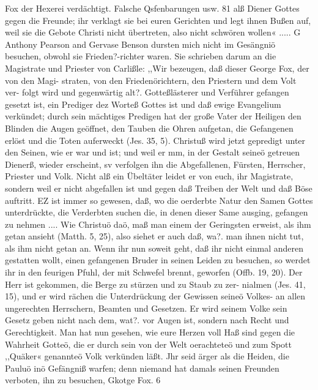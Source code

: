 Fox der Hexerei verdächtigt. Falsche Qsfenbarungen usw. 81
alß Diener Gottes gegen die Freunde; ihr verklagt sie bei euren
Gerichten und legt ihnen Bußen auf, weil sie die Gebote Christi
nicht übertreten, also nicht schwören wollen« ..... G
Anthony Pearson and Gervase Benson dursten mich nicht im
Gesängniö besuchen, obwohl sie Frieden?-richter waren. Sie
schrieben darum an die Magistrate und Priester von Carlißle:
,,Wir bezeugen, daß dieser George Fox, der von den Magi-
straten, von den Friedenörichtern, den Priestern und dem Volt ver-
folgt wird und gegenwärtig alt?. Gotteßlästerer und Verführer
gefangen gesetzt ist, ein Prediger dez Worteß Gottes ist und daß
ewige Evangelium verkündet; durch sein mächtiges Predigen hat
der große Vater der Heiligen den Blinden die Augen geöffnet,
den Tauben die Ohren aufgetan, die Gefangenen erlöst und die
Toten auferweckt (Jes. 35, 5). Christuß wird jetzt gepredigt unter
den Seinen, wie er war und ist; und weil er mm, in der Gestalt
seineö getreuen Dienerß, wieder erscheint, sv verfolgen ihn die
Abgefallenen, Fürsten, Herrscher, Priester und Volk. Nicht alß
ein Übeltäter leidet er von euch, ihr Magistrate, sondern weil er
nicht abgefallen ist und gegen daß Treiben der Welt und daß
Böse auftritt. EZ ist immer so gewesen, daß, wo die oerderbte
Natur den Samen Gottes unterdrückte, die Verderbten suchen die,
in denen dieser Same ausging, gefangen zu nehmen .... Wie
Christuö daö, maß man einem der Geringsten erweist, als ihm
getan ansieht (Matth. 5, 25), also siehet er auch daß, wa?. man
ihnen nicht tut, als ihm nicht getan an. Wenn ihr nun soweit
geht, daß ihr nicht einmal anderen gestatten wollt, einen gefangenen
Bruder in seinen Leiden zu besuchen, so werdet ihr in den feurigen
Pfuhl, der mit Schwefel brennt, geworfen (Offb. 19, 20). Der
Herr ist gekommen, die Berge zu stürzen und zu Staub zu zer-
nialmen (Jes. 41, 15), und er wird rächen die Unterdrückung der
Gewissen seineö Volkes- an allen ungerechten Herrschern, Beamten
und Gesetzen. Er wird seinem Volke sein Gesetz geben nicht nach
dem, wat?. vor Augen ist, sondern nach Recht und Gerechtigkeit.
Man hat nun gesehen, wie eure Herzen voll Haß sind gegen die
Wahrheit Gotteö, die er durch sein von der Welt oerachteteö und
zum Spott ,,Quäker« genannteö Volk verkünden läßt. Jhr seid
ärger als die Heiden, die Pauluö inö Gefängniß warfen; denn
niemand hat damals seinen Freunden verboten, ihn zu besuchen,
Gkotge Fox. 6


